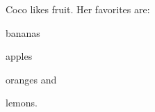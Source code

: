 \documentclass[twocolumn]{article}
\begin{document}
                \blindtext Coco likes fruit. Her favorites are:
                     \begin{enumerate*}[label={\alph*)},font={\color{red!50!black}\bfseries}]
                              \item bananas
                              \item apples
                              \item oranges and
                              \item lemons.
                     \end{enumerate*}
                        \blindtext
          
\end{document}
